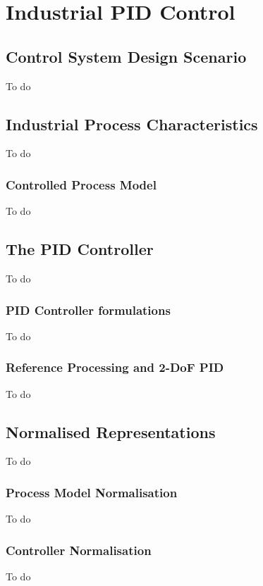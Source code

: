 \chapter{Industrial PID Control}
\label{chap:IndustrialPID}

\section{Control System Design Scenario}
To do
\section{Industrial Process Characteristics}
To do
\subsection{Controlled Process Model}
To do
\section{The PID Controller}
To do
\subsection{PID Controller formulations}
To do
\subsection{Reference Processing and 2-DoF PID}
To do
\section{Normalised Representations}
To do
\subsection{Process Model Normalisation}
To do
\subsection{Controller Normalisation}
To do
